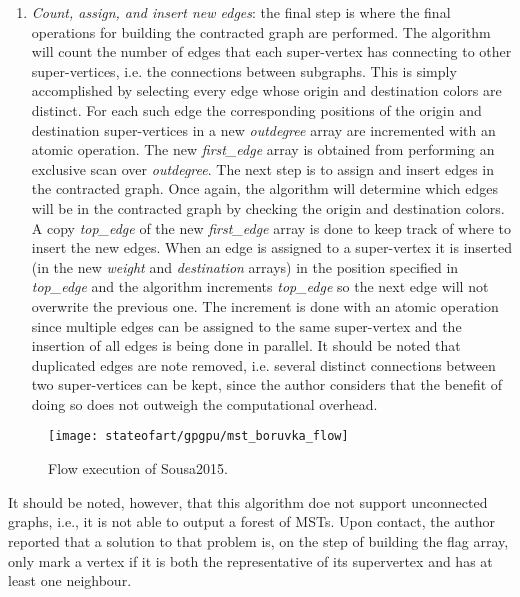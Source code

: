 \begin{enumerate}
	\item \emph{Count, assign, and insert new edges}: the final step is where the final operations for building the contracted graph are performed.
	The algorithm will count the number of edges that each super-vertex has connecting to other super-vertices, i.e. the connections between subgraphs.
	This is simply accomplished by selecting every edge whose origin and destination colors are distinct.
	For each such edge the corresponding positions of the origin and destination super-vertices in a new \emph{outdegree} array are incremented with an atomic operation.
	The new \emph{first\_edge} array is obtained from performing an exclusive scan over \emph{outdegree}.
	The next step is to assign and insert edges in the contracted graph.
	Once again, the algorithm will determine which edges will be in the contracted graph by checking the origin and destination colors.
	A copy \emph{top\_edge} of the new \emph{first\_edge} array is done to keep track of where to insert the new edges.
	When an edge is assigned to a super-vertex it is inserted (in the new \emph{weight} and \emph{destination} arrays) in the position specified in \emph{top\_edge} and the algorithm increments \emph{top\_edge} so the next edge will not overwrite the previous one.
	The increment is done with an atomic operation since multiple edges can be assigned to the same super-vertex and the insertion of all edges is being done in parallel.
	It should be noted that duplicated edges are note removed, i.e. several distinct connections between two super-vertices can be kept, since the author considers that the benefit of doing so does not outweigh the computational overhead.
\end{enumerate}

\begin{figure}[hbtp]
\centering
\texttt{[image: stateofart/gpgpu/mst\_boruvka\_flow]}
\caption{Flow execution of Sousa2015.}
\label{fig:mst sousa}
\end{figure}

It should be noted, however, that this algorithm doe not support unconnected graphs, i.e., it is not able to output a forest of MSTs.
Upon contact, the author reported that a solution to that problem is, on the step of building the flag array, only mark a vertex if it is both the representative of its supervertex and has at least one neighbour.

